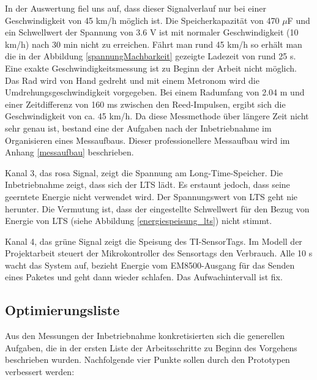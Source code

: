 In der Auswertung fiel uns auf, dass dieser Signalverlauf nur bei einer Geschwindigkeit von 45 km/h möglich ist. Die Speicherkapazität von 470 $\mu$F und ein Schwellwert der Spannung von 3.6 V ist mit normaler Geschwindigkeit (10 km/h) nach 30 min nicht zu erreichen. Fährt man rund 45 km/h so erhält man die in der Abbildung \ref{spannungMachbarkeit} gezeigte Ladezeit von rund 25 s. Eine exakte Geschwindigkeitsmessung ist zu Beginn der Arbeit nicht möglich. Das Rad wird von Hand gedreht und mit einem Metronom wird die Umdrehungsgeschwindigkeit vorgegeben. Bei einem Radumfang von 2.04 m und einer Zeitdifferenz von 160 ms zwischen den Reed-Impulsen, ergibt sich die Geschwindigkeit von ca. 45 km/h. Da diese Messmethode über längere Zeit nicht sehr genau ist, bestand eine der Aufgaben nach der Inbetriebnahme im Organisieren eines Messaufbaus. Dieser professionellere Messaufbau wird im Anhang \ref{messaufbau} beschrieben.

Kanal 3, das rosa Signal, zeigt die Spannung am Long-Time-Speicher. Die Inbetriebnahme zeigt, dass sich der LTS lädt. Es erstaunt jedoch, dass seine geerntete Energie nicht verwendet wird. Der Spannungswert von LTS geht nie herunter.
Die Vermutung ist, dass der eingestellte Schwellwert für den Bezug von Energie von LTS (siehe Abbildung \ref{energiespeisung_lts}) nicht stimmt.

Kanal 4, das grüne Signal zeigt die Speisung des TI-SensorTags. Im Modell der Projektarbeit steuert der Mikrokontroller des Sensortags den Verbrauch. Alle 10 s wacht das System auf, bezieht Energie vom EM8500-Ausgang für das Senden eines Paketes und geht dann wieder schlafen. Das Aufwachintervall ist fix.


\subsection{Optimierungsliste}\label{optimierung} 

Aus den Messungen der Inbetriebnahme konkretisierten sich die generellen Aufgaben, die in der ersten Liste der Arbeitsschritte zu Beginn des Vorgehens  beschrieben wurden. Nachfolgende vier Punkte sollen durch den Prototypen verbessert werden: 

